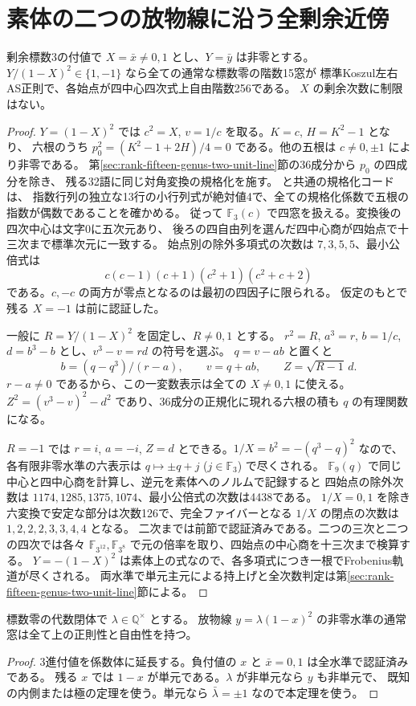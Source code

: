 \section{素体の二つの放物線に沿う全剰余近傍}
\label{sec:rank-fifteen-prime-parabolic-pencils}
\begin{theorem}\label{thm:rank-fifteen-prime-parabolic-pencils}
剰余標数3の付値で $X=\bar x\ne0,1$ とし、$Y=\bar y$ は非零とする。
$Y/(1-X)^2\in\{1,-1\}$ なら全ての通常な標数零の階数15窓が
標準Koszul左右AS正則で、各始点が四中心四次式上自由階数256である。
$X$ の剰余次数に制限はない。
\end{theorem}
\begin{proof}
$Y=(1-X)^2$ では $c^2=X$, $v=1/c$ を取る。$K=c$, $H=K^2-1$ となり、
六根のうち $p_0^2=(K^2-1+2H)/4=0$ である。他の五根は $c\ne0,\pm1$ により非零である。
第\ref{sec:rank-fifteen-genus-two-unit-line}節の36成分から $p_0$ の四成分を除き、
残る32語に同じ対角変換の規格化を施す。
 と共通の規格化コードは、
指数行列の独立な13行の小行列式が絶対値4で、全ての規格化係数で五根の指数が偶数であることを確かめる。
従って $\mathbb F_3(c)$ で四窓を扱える。変換後の四次中心は文字0に五次元あり、
後ろの四自由列を選んだ四中心商が四始点で十三次まで標準次元に一致する。
始点別の除外多項式の次数は $7,3,5,5$、最小公倍式は
\[
 c(c-1)(c+1)(c^2+1)(c^2+c+2)
\]
である。$c,-c$ の両方が零点となるのは最初の四因子に限られる。
仮定のもとで残る $X=-1$ は前に認証した。

一般に $R=Y/(1-X)^2$ を固定し、$R\ne0,1$ とする。
$r^2=R$, $a^3=r$, $b=1/c$, $d=b^3-b$ とし、$v^3-v=r d$ の符号を選ぶ。
$q=v-ab$ と置くと
\[
 b=(q-q^3)/(r-a),\qquad v=q+ab,\qquad Z=\sqrt{R-1}\,d .
\]
$r-a\ne0$ であるから、この一変数表示は全ての $X\ne0,1$ に使える。
$Z^2=(v^3-v)^2-d^2$ であり、36成分の正規化に現れる六根の積も $q$ の有理関数になる。

$R=-1$ では $r=i$, $a=-i$, $Z=d$ とできる。$1/X=b^2=-(q^3-q)^2$ なので、
各有限非零水準の六表示は $q\mapsto\pm q+j$ ($j\in\mathbb F_3$) で尽くされる。
$\mathbb F_9(q)$ で同じ中心と四中心商を計算し、逆元を素体へのノルムで記録すると
四始点の除外次数は $1174,1285,1375,1074$、最小公倍式の次数は4438である。
$1/X=0,1$ を除き六変換で安定な部分は次数126で、完全ファイバーとなる
$1/X$ の閉点の次数は $1,2,2,2,3,3,4,4$ となる。
二次までは前節で認証済みである。二つの三次と二つの四次では各々
$\mathbb F_{3^{12}},\mathbb F_{3^8}$ で元の倍率を取り、四始点の中心商を十三次まで検算する。
$Y=-(1-X)^2$ は素体上の式なので、各多項式につき一根でFrobenius軌道が尽くされる。
両水準で単元主元による持上げと全次数判定は第\ref{sec:rank-fifteen-genus-two-unit-line}節による。
\end{proof}

\begin{corollary}
標数零の代数閉体で $\lambda\in\mathbb Q^\times$ とする。
放物線 $y=\lambda(1-x)^2$ の非零水準の通常窓は全て上の正則性と自由性を持つ。
\end{corollary}
\begin{proof}
3進付値を係数体に延長する。負付値の $x$ と $\bar x=0,1$ は全水準で認証済みである。
残る $x$ では $1-x$ が単元である。$\lambda$ が非単元なら $y$ も非単元で、
既知の内側または極の定理を使う。単元なら $\bar\lambda=\pm1$ なので本定理を使う。
\end{proof}
